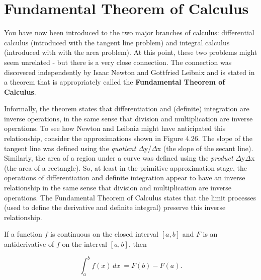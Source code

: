 \documentclass[12pt]{article}
\begin{document}

\color{mypink}\section*{Fundamental Theorem of Calculus}
\color{black}
You have now been introduced to the two major branches of calculus: differential calculus (introduced with the tangent line problem) and integral calculus (introduced with with the area problem). At this point, these two problems might seem unrelated - but there is a very close connection. The connection was discovered independently by Isaac Newton and Gottfried Leibnix and is stated in a theorem that is appropriately called the \textbf{Fundamental Theorem of Calculus}.

Informally, the theorem states that differentiation and (definite) integration are inverse operations, in the same sense that division and multiplication are inverse operations. To see how Newton and Leibniz might have anticipated this relationship, consider the approximations shown in Figure 4.26. The slope of the tangent line was defined using the \textit{quotient} $\Delta$y/$\Delta$x (the slope of the secant line). Similarly, the area of a region under a curve was defined using the \textit{product} $\Delta$y$\Delta$x (the area of a rectangle). So, at least in the primitive approximation stage, the operations of differentiation and definite integration appear to have an inverse relationship in the same sense that division and multiplication are inverse operations. The Fundamental Theorem of Calculus states that the limit processes (used to define the derivative and definite integral) preserve this inverse relationship.

\bigskip 
 
\begin{tcolorbox}[colback = white!5!white, 
				  colframe = myblue,
				  colbacktitle = white!5!white,
				  drop shadow southeast, 
				  enhanced,
				  sharp corners = all, 
title =\color{myblue}\textbf{THEOREM 4.9 \color{black} THE FUNDAMENTAL THEOREM OF CALCULUS}]
If a function $f$ is continuous on the closed interval $[a,b]$ and $F$ is an antiderivative of $f$ on the interval $[a,b]$, then

$$ \int_{a}^{b} f(x) \,dx \ = F(b) - F(a).$$ 

\end{tcolorbox}
\end{document}
